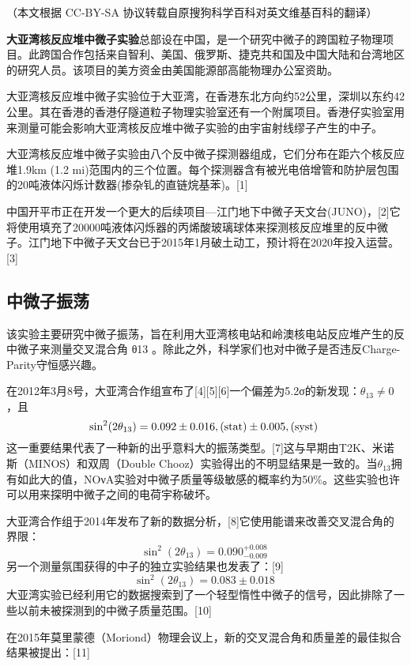 
（本文根据 CC-BY-SA 协议转载自原搜狗科学百科对英文维基百科的翻译）

\textbf{大亚湾核反应堆中微子实验}总部设在中国，是一个研究中微子的跨国粒子物理项目。此跨国合作包括来自智利、美国、俄罗斯、捷克共和国及中国大陆和台湾地区的研究人员。该项目的美方资金由美国能源部高能物理办公室资助。

大亚湾核反应堆中微子实验位于大亚湾，在香港东北方向约52公里，深圳以东约42公里。其在香港的香港仔隧道粒子物理实验室还有一个附属项目。香港仔实验室用来测量可能会影响大亚湾核反应堆中微子实验的由宇宙射线缪子产生的中子。

大亚湾核反应堆中微子实验由八个反中微子探测器组成，它们分布在距六个核反应堆1.9km (1.2 mi)范围内的三个位置。每个探测器含有被光电倍增管和防护层包围的20吨液体闪烁计数器(掺杂钆的直链烷基苯)。[1]

中国开平市正在开发一个更大的后续项目—江门地下中微子天文台(JUNO)，[2]它将使用填充了20000吨液体闪烁器的丙烯酸玻璃球体来探测核反应堆里的反中微子。江门地下中微子天文台已于2015年1月破土动工，预计将在2020年投入运营。[3]

\subsection{中微子振荡}
该实验主要研究中微子振荡，旨在利用大亚湾核电站和岭澳核电站反应堆产生的反中微子来测量交叉混合角 θ13 。除此之外，科学家们也对中微子是否违反Charge-Parity守恒感兴趣。

在2012年3月8号，大亚湾合作组宣布了[4][5][6]一个偏差为5.2σ的新发现：$\theta_{13} \neq 0$，且
$$\sin^2(2 \theta_{13}) = 0.092 \pm 0.016 \\, (\text{stat}) \pm 0.005 \\, (\text{syst})~$$
这一重要结果代表了一种新的出乎意料大的振荡类型。[7]这与早期由T2K、米诺斯（MINOS）和双周（Double Chooz）实验得出的不明显结果是一致的。当$\theta_{13}$拥有如此大的值，NOνA实验对中微子质量等级敏感的概率约为50\%。这些实验也许可以用来探明中微子之间的电荷宇称破坏。

大亚湾合作组于2014年发布了新的数据分析，[8]它使用能谱来改善交叉混合角的界限：
$$\sin^2(2 \theta_{13}) = 0.090^{+0.008}_{-0.009}~$$
另一个测量氛围获得的中子的独立实验结果也发表了：[9]
$$\sin^2(2 \theta_{13}) = 0.083 \pm 0.018~$$
大亚湾实验已经利用它的数据搜索到了一个轻型惰性中微子的信号，因此排除了一些以前未被探测到的中微子质量范围。[10]

在2015年莫里蒙德（Moriond）物理会议上，新的交叉混合角和质量差的最佳拟合结果被提出：[11]